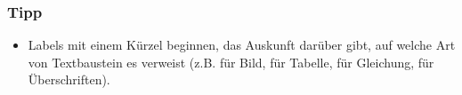 \subsubsection{Tipp}%
%
\begin{itemize}%
\item Labels mit einem Kürzel beginnen, das Auskunft darüber gibt, auf welche Art von Textbaustein es verweist (z.B.  für Bild,  für Tabelle,  für Gleichung,  für Überschriften).%
\end{itemize}%
%